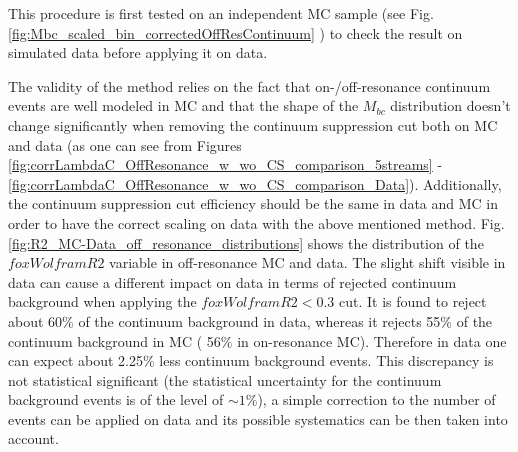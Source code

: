 \noindent This procedure is first tested on an independent MC sample (see Fig. \ref{fig:Mbc_scaled_bin_correctedOffResContinuum} ) to check the result on simulated data before applying it on data.





The validity of the method relies on the fact that  on-/off-resonance continuum events are well modeled in MC and that the shape of the $M_{bc}$ distribution doesn't change significantly when removing the continuum suppression cut both on MC and data (as one can see from Figures \ref{fig:corrLambdaC_OffResonance_w_wo_CS_comparison_5streams} - \ref{fig:corrLambdaC_OffResonance_w_wo_CS_comparison_Data}).
Additionally, the continuum suppression cut efficiency should be the same in data and MC in order to have the correct scaling on data with the above mentioned method. Fig. \ref{fig:R2_MC-Data_off_resonance_distributions} shows the distribution of the $foxWolframR2$ variable in off-resonance MC and data. The slight shift visible in data can cause a different impact on data in terms of rejected continuum background when applying the $foxWolframR2 < 0.3$ cut. It is found to reject about 60$\%$ of the continuum background in data, whereas it rejects 55$\%$ of the continuum background in MC ( 56$\%$ in on-resonance MC). Therefore in data one can expect about 2.25$\%$ less continuum background events. This discrepancy is not statistical significant (the statistical uncertainty for the continuum background events is of the level of $\sim 1\%$),  a simple correction to the number of events can be applied on data and its possible systematics can be then taken into account.%


